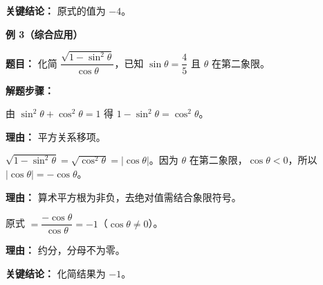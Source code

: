 \begin{examplebox}
	\textbf{\textcolor{CExample}{关键结论：}}
	原式的值为 $-4$。

	\medskip
	\textbf{\textcolor{CExample}{例 3（综合应用）}}

	\textbf{\textcolor{CExample}{题目：}}
	化简 $\dfrac{\sqrt{1-\sin^2\theta}}{\cos\theta}$，已知 $\sin\theta=\dfrac{4}{5}$ 且 $\theta$ 在第二象限。

	\textbf{\textcolor{CExample}{解题步骤：}}
	\begin{description}[style=nextline, leftmargin=2.8em, labelsep=0.5em, itemsep=0.45em]
		\item[\textbf{第一步（平方变形）：}] 由 $\sin^2\theta+\cos^2\theta=1$ 得 $1-\sin^2\theta=\cos^2\theta$。
			\par\textbf{理由：} 平方关系移项。
		\item[\textbf{第二步（开方与符号）：}] $\sqrt{1-\sin^2\theta}=\sqrt{\cos^2\theta}=|\cos\theta|$。因为 $\theta$ 在第二象限，$\cos\theta<0$，所以 $|\cos\theta|=-\cos\theta$。
			\par\textbf{理由：} 算术平方根为非负，去绝对值需结合象限符号。
		\item[\textbf{第三步（代入求值）：}] 原式 $=\dfrac{-\cos\theta}{\cos\theta}=-1$（$\cos\theta\neq0$）。
			\par\textbf{理由：} 约分，分母不为零。
	\end{description}

	\textbf{\textcolor{CExample}{关键结论：}}
	化简结果为 $-1$。
\end{examplebox}
